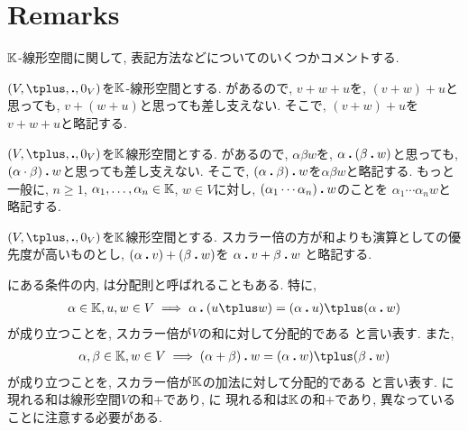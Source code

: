 \section{Remarks}

$\mathbb{K}$-線形空間に関して,
表記方法などについてのいくつかコメントする.
\begin{remark}
$(V,\plus,\act,0_V)$を$\mathbb{K}$-線形空間とする.
があるので, $v\plus w\plus u$を, $(v\plus w)\plus u$と思っても,
$v\plus (w\plus u)$と思っても差し支えない.
そこで, $(v\plus w)\plus u$を$v\plus w\plus u$と略記する.
\end{remark}
\begin{remark}
$(V,\plus,\act,0_V)$を$\mathbb{K}$線形空間とする.
があるので, $\alpha \beta w$を, $\alpha\mathbin{\boldsymbol{.}} (\beta\mathbin{\boldsymbol{.}} w)$と思っても,
$(\alpha\cdot\beta)\mathbin{\boldsymbol{.}} w$と思っても差し支えない.
そこで, $(\alpha\mathbin{\boldsymbol{.}} \beta)\mathbin{\boldsymbol{.}} w$を$\alpha \beta w$と略記する.
もっと一般に, $n\geq 1$, $\alpha_1,\ldots,\alpha_n\in\mathbb{K}$, $w\in V$に対し,
$(\alpha_1\cdots \alpha_n)\mathbin{\boldsymbol{.}} w$のことを
$\alpha_1\cdots \alpha_n w$と略記する.
\end{remark}
\begin{remark}
$(V,\plus,\act,0_V)$を$\mathbb{K}$線形空間とする.
スカラー倍の方が和よりも演算としての優先度が高いものとし,
$(\alpha\mathbin{\boldsymbol{.}} v)+(\beta\mathbin{\boldsymbol{.}} w)$を
$\alpha\mathbin{\boldsymbol{.}} v+\beta\mathbin{\boldsymbol{.}} w$
と略記する.
\end{remark}

\begin{remark}
にある条件の内,
は分配則と呼ばれることもある.
特に, 
\begin{align*}
\alpha\in \KK,u,w\in V \implies \alpha\act (u\plus w)=(\alpha\act u)\plus (\alpha\act w)
\end{align*}
が成り立つことを, スカラー倍が$V$の和に対して分配的である
と言い表す.
また,  
\begin{align*}
\alpha,\beta\in\KK, w\in V\implies (\alpha+\beta)\act w=(\alpha\act w)\plus (\beta\act w)
\end{align*}
が成り立つことを, スカラー倍が$\mathbb{K}$の加法に対して分配的である
と言い表す.
に
現れる和は線形空間$V$の和$\plus$であり,
 に
現れる和は$\mathbb{K}$の和$+$であり,
異なっていることに注意する必要がある.
\end{remark}

